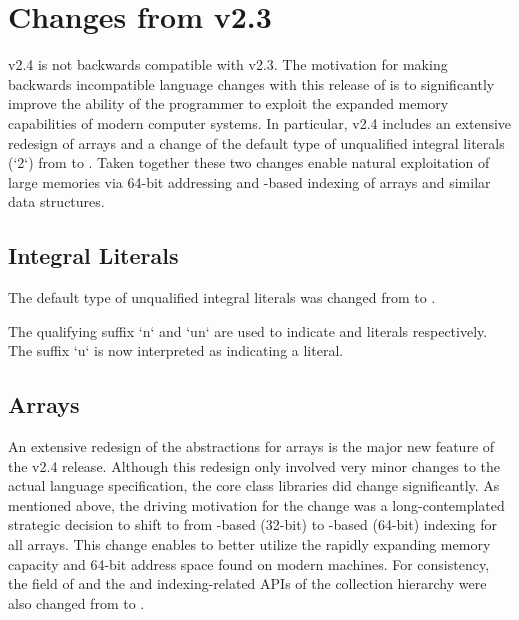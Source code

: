 \section{Changes from \Xten{} v2.3}
\Xten{} v2.4 is not backwards compatible with \Xten{} v2.3. The
motivation for making backwards incompatible language changes with
this release of \Xten{} is to significantly improve the ability of the
\Xten{} programmer to exploit the expanded memory capabilities of
modern computer systems.  In particular, \Xten{} v2.4 includes an
extensive redesign of arrays and a change of the default type of
unqualified integral literals (\eg \xcd`2`) from  to
. Taken together these two changes enable natural
exploitation of large memories via 64-bit addressing and
-based indexing of arrays and similar data structures. 

\subsection{Integral Literals}

The default type of unqualified integral literals was changed from
 to . 

The qualifying suffix \xcd`n` and \xcd`un` are used to indicate
 and  literals respectively.  The suffix \xcd`u` is
now interpreted as indicating a  literal.

\subsection{Arrays}

An extensive redesign of the \Xten{} abstractions for arrays is the
major new feature of the \Xten{} v2.4 release.  Although this redesign
only involved very minor changes to the actual \Xten{} language
specification, the core class libraries did change significantly.  As
mentioned above, the driving motivation for
the change was a long-contemplated strategic decision to shift to from
-based (32-bit) to -based (64-bit) indexing for all
\Xten{} arrays. This change enables \Xten{} to better utilize the rapidly
expanding memory capacity and 64-bit address space found on modern
machines. For consistency, the  field of  and
the  and indexing-related APIs of the 
collection hierarchy were also changed from  to .

